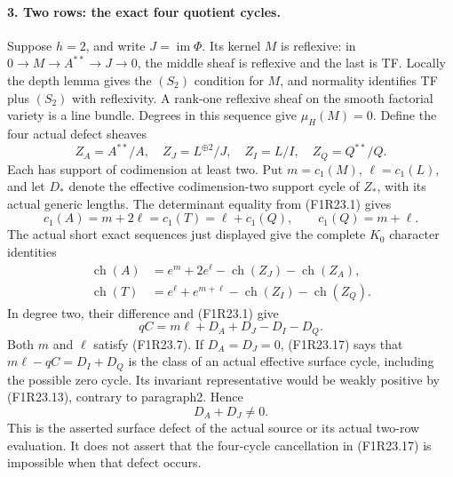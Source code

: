 \paragraph{3. Two rows: the exact four quotient cycles.}
Suppose $h=2$, and write $J=\operatorname{im}\Phi$.
Its kernel $M$ is reflexive: in
$0\to M\to A^{**}\to J\to0$, the middle sheaf
is reflexive and the last is TF. Locally the depth
lemma gives the $(S_2)$ condition for $M$, and
normality identifies TF plus $(S_2)$ with
reflexivity. A rank-one reflexive sheaf on the
smooth factorial variety is a line bundle.
Degrees in this sequence give $\mu_H(M)=0$.
Define the four actual defect sheaves
\[
 Z_A=A^{**}/A,\quad Z_J=L^{\oplus2}/J,
       \quad Z_I=L/I,\quad Z_Q=Q^{**}/Q.
 \tag{F1R23.14}
\]
Each has support of codimension at least two.
Put $m=c_1(M)$, $\ell=c_1(L)$, and let $D_*$
denote the effective codimension-two support cycle
of $Z_*$, with its actual generic lengths.
The determinant equality from (F1R23.1) gives
\[
 c_1(A)=m+2\ell=c_1(T)=\ell+c_1(Q),
                         \qquad c_1(Q)=m+\ell.
 \tag{F1R23.15}
\]
The actual short exact sequences just displayed
give the complete $K_0$ character identities
\[
 \begin{split}
 \operatorname{ch}(A)&=e^m+2e^\ell
                    -\operatorname{ch}(Z_J)-\operatorname{ch}(Z_A),\\
 \operatorname{ch}(T)&=e^\ell+e^{m+\ell}
                    -\operatorname{ch}(Z_I)-\operatorname{ch}(Z_Q).
 \end{split}
 \tag{F1R23.16}
\]
In degree two, their difference and (F1R23.1) give
\[
                  qC=m\ell+D_A+D_J-D_I-D_Q.
 \tag{F1R23.17}
\]
Both $m$ and $\ell$ satisfy (F1R23.7).
If $D_A=D_J=0$, (F1R23.17) says that
$m\ell-qC=D_I+D_Q$ is the class of an actual
effective surface cycle, including the possible
zero cycle. Its invariant representative would
be weakly positive by (F1R23.13), contrary to
paragraph2. Hence
\[
                              D_A+D_J\ne0.
 \tag{F1R23.18}
\]
This is the asserted surface defect of the actual
source or its actual two-row evaluation. It does
not assert that the four-cycle cancellation in
(F1R23.17) is impossible when that defect occurs.

